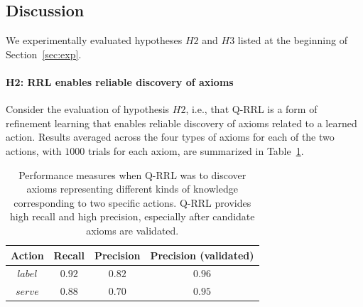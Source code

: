\documentclass{article}
\newcounter{ctr}
\begin{document}


\subsection{Discussion}
\label{sec:exp-discuss}
We experimentally evaluated hypotheses $H2$ and $H3$ listed at the
beginning of Section~\ref{sec:exp}.

\paragraph{H2: RRL enables reliable discovery of axioms}
Consider the evaluation of hypothesis $H2$, i.e., that Q-RRL is a form
of refinement learning that enables reliable discovery of axioms
related to a learned action. Results averaged across the four types of
axioms for each of the two actions, with $1000$ trials for each axiom,
are summarized in Table~\ref{tab:hyp2}.

\begin{table}[tbh]
  \centering
  \begin{tabular}{|c|c|c|c|}
    \hline
    \textbf{Action} & \textbf{Recall} & \textbf{Precision} & \textbf{Precision (validated)} \\\hline
    $label$  & $0.92$ & $0.82$ & $0.96$ \\ \hline
    $serve$  & $0.88$ & $0.70$ & $0.95$ \\ \hline
  \end{tabular}
  \caption{Performance measures when Q-RRL was to discover axioms representing different kinds of knowledge corresponding to two specific actions. Q-RRL provides high recall and high precision, especially after candidate axioms are validated.}
  \label{tab:hyp2}
\end{table}
\end{document}
